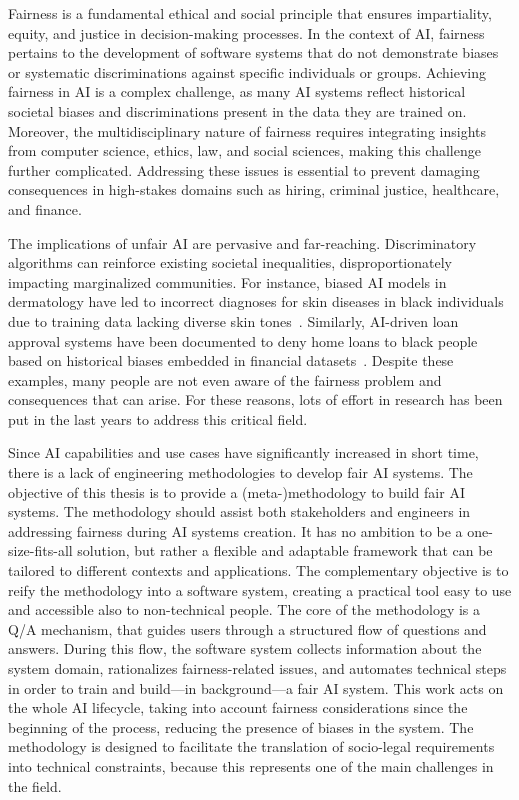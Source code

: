\documentclass[12pt,a4paper,openright,twoside]{book}
\begin{document}
Fairness is a fundamental ethical and social principle that ensures impartiality, equity, and justice in decision-making processes.
%
In the context of \acf{AI}, fairness pertains to the development of software systems that do not demonstrate biases or systematic discriminations against specific individuals or groups.
%
Achieving fairness in \ac{AI} is a complex challenge, as many \ac{AI} systems reflect historical societal biases and discriminations present in the data they are trained on.
%
Moreover, the multidisciplinary nature of fairness requires integrating insights from computer science, ethics, law, and social sciences, making this challenge further complicated.
%
Addressing these issues is essential to prevent damaging consequences in high-stakes domains such as hiring, criminal justice, healthcare, and finance.


The implications of unfair \ac{AI} are pervasive and far-reaching.
%
Discriminatory algorithms can reinforce existing societal inequalities, disproportionately impacting marginalized communities.
%
For instance, biased AI models in dermatology have led to incorrect diagnoses for skin diseases in black individuals due to training data lacking diverse skin tones~\cite{skin-diseases}.
%
Similarly, AI-driven loan approval systems have been documented to deny home loans to black people based on historical biases embedded in financial datasets~\cite{weber2020black}.
%
Despite these examples, many people are not even aware of the fairness problem and consequences that can arise.
%
For these reasons, lots of effort in research has been put in the last years to address this critical field.

Since \ac{AI} capabilities and use cases have significantly increased in short time, there is a lack of engineering methodologies to develop fair \ac{AI} systems.
%
The objective of this thesis is to provide a (meta-)methodology to build fair \ac{AI} systems.
%
The methodology should assist both stakeholders and engineers in addressing fairness during \ac{AI} systems creation.
%
It has no ambition to be a one-size-fits-all solution, but rather a flexible and adaptable framework that can be tailored to different contexts and applications.
%
The complementary objective is to reify the methodology into a software system, creating a practical tool easy to use and accessible also to non-technical people.
%
The core of the methodology is a \acf{Q/A} mechanism, that guides users through a structured flow of questions and answers.
%
During this flow, the software system collects information about the system domain, rationalizes fairness-related issues, and automates technical steps in order to train and build---in background---a fair \ac{AI} system.
%
This work acts on the whole \ac{AI} lifecycle, taking into account fairness considerations since the beginning of the process, reducing the presence of biases in the system.
%
The methodology is designed to facilitate the translation of socio-legal requirements into technical constraints, because this represents one of the main challenges in the field.
\end{document}
